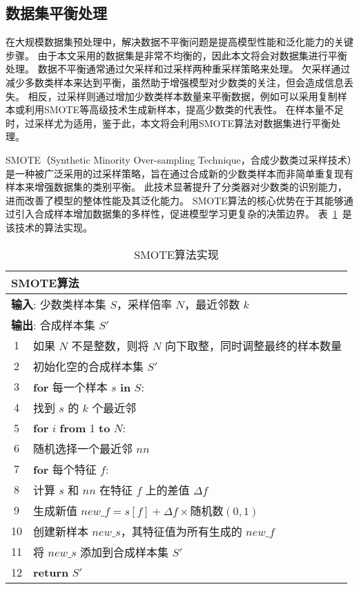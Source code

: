 \subsection{数据集平衡处理}
在大规模数据集预处理中，解决数据不平衡问题是提高模型性能和泛化能力的关键步骤。
由于本文采用的数据集是非常不均衡的，因此本文将会对数据集进行平衡处理。
数据不平衡通常通过欠采样和过采样两种重采样策略来处理。
欠采样通过减少多数类样本来达到平衡，虽然助于增强模型对少数类的关注，但会造成信息丢失。
相反，过采样则通过增加少数类样本数量来平衡数据，例如可以采用复制样本或利用SMOTE等高级技术生成新样本，提高少数类的代表性。
在样本量不足时，过采样尤为适用，鉴于此，本文将会利用SMOTE算法对数据集进行平衡处理。\par


SMOTE（Synthetic Minority Over-sampling Technique，合成少数类过采样技术）是一种被广泛采用的过采样策略，旨在通过合成新的少数类样本而非简单重复现有样本来增强数据集的类别平衡。
此技术显著提升了分类器对少数类的识别能力，进而改善了模型的整体性能及其泛化能力。
SMOTE算法的核心优势在于其能够通过引入合成样本增加数据集的多样性，促进模型学习更复杂的决策边界\cite{chawla2002smote}\cite{fernandez2018smote}。
表~\ref{tab:smote}~是该技术的算法实现。
\begin{table}[htbp]
  \caption{SMOTE算法实现}
  \label{tab:smote}
  \centering
  \begin{tabularx}{1.0\textwidth}{cl}
  \toprule
  \multicolumn{2}{l}{\textbf{SMOTE算法}}\\
  \midrule
  \multicolumn{2}{l}{\textbf{输入}: 少数类样本集 $S$，采样倍率 $N$，最近邻数 $k$} \\ 
  \multicolumn{2}{l}{\textbf{输出}: 合成样本集 $S'$} \\
  1& 如果 $N$ 不是整数，则将 $N$ 向下取整，同时调整最终的样本数量 \\
  2& 初始化空的合成样本集 $S'$ \\
  3& \textbf{for} 每一个样本 $s$ \textbf{in} $S$: \\
  4&\quad 找到 $s$ 的 $k$ 个最近邻 \\
  5&\quad \textbf{for} $i$ \textbf{from} 1 \textbf{to} $N$: \\
  6&\quad\quad 随机选择一个最近邻 $nn$ \\
  7&\quad\quad \textbf{for} 每个特征 $f$: \\
  8&\quad\quad\quad 计算 $s$ 和 $nn$ 在特征 $f$ 上的差值 $\Delta f$ \\
  9&\quad\quad\quad 生成新值 $new\_f = s[f] + \Delta f \times \text{随机数}(0, 1)$ \\
  10&\quad\quad 创建新样本 $new\_s$，其特征值为所有生成的 $new\_f$ \\
  11&\quad\quad 将 $new\_s$ 添加到合成样本集 $S'$ \\
  12&\textbf{return} $S'$ \\ 
  \bottomrule
  \end{tabularx}
\end{table}

